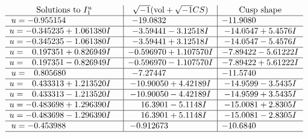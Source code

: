 \documentclass[1p]{elsarticle_modified}
\theoremstyle{definition}
\newcommand{\I}{\sqrt{-1}}
\begin{document}
$$\begin{array}{c|c|c}  
\text{Solutions to }I^u_{1}& \I (\text{vol} + \sqrt{-1}CS) & \text{Cusp shape}\\
 \hline 
\begin{aligned}
u &= -0.955154\phantom{ +0.000000I}\end{aligned}
 & -19.0832\phantom{ +0.000000I} & -11.9080\phantom{ +0.000000I} \\ \hline\begin{aligned}
u &= -0.345235 + 1.061380 I\end{aligned}
 & -3.59441 - 3.12518 I & -14.0547 + 5.4576 I \\ \hline\begin{aligned}
u &= -0.345235 - 1.061380 I\end{aligned}
 & -3.59441 + 3.12518 I & -14.0547 - 5.4576 I \\ \hline\begin{aligned}
u &= \phantom{-}0.197351 + 0.826949 I\end{aligned}
 & -0.596970 + 1.107570 I & -7.89422 - 5.61222 I \\ \hline\begin{aligned}
u &= \phantom{-}0.197351 - 0.826949 I\end{aligned}
 & -0.596970 - 1.107570 I & -7.89422 + 5.61222 I \\ \hline\begin{aligned}
u &= \phantom{-}0.805680\phantom{ +0.000000I}\end{aligned}
 & -7.27447\phantom{ +0.000000I} & -11.5740\phantom{ +0.000000I} \\ \hline\begin{aligned}
u &= \phantom{-}0.433313 + 1.213520 I\end{aligned}
 & -10.90050 + 4.42189 I & -14.9599 - 3.5435 I \\ \hline\begin{aligned}
u &= \phantom{-}0.433313 - 1.213520 I\end{aligned}
 & -10.90050 - 4.42189 I & -14.9599 + 3.5435 I \\ \hline\begin{aligned}
u &= -0.483698 + 1.296390 I\end{aligned}
 & \phantom{-}16.3901 - 5.1148 I & -15.0081 + 2.8305 I \\ \hline\begin{aligned}
u &= -0.483698 - 1.296390 I\end{aligned}
 & \phantom{-}16.3901 + 5.1148 I & -15.0081 - 2.8305 I \\ \hline\begin{aligned}
u &= -0.453988\phantom{ +0.000000I}\end{aligned}
 & -0.912673\phantom{ +0.000000I} & -10.6840\phantom{ +0.000000I}\\
 \hline 
 \end{array}$$\newpage
\end{document}
